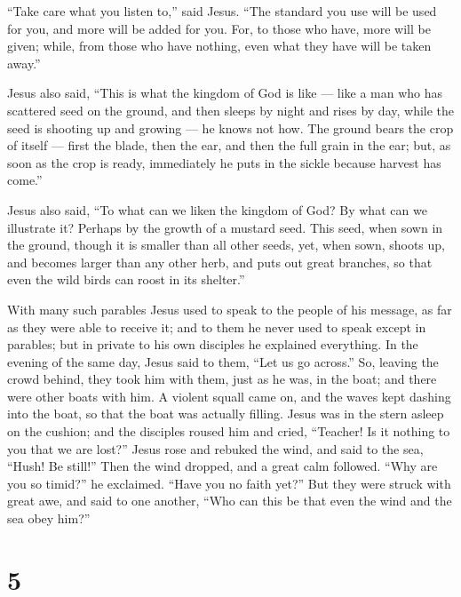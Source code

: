  ``Take care what you listen to,'' said Jesus. ``The
standard you use will be used for you, and more will be added for you.
 For, to those who have, more will be given; while, from
those who have nothing, even what they have will be taken away.''

 Jesus also said, ``This is what the kingdom of God is like
--- like a man who has scattered seed on the ground,  and
then sleeps by night and rises by day, while the seed is shooting up and
growing --- he knows not how.  The ground bears the crop of
itself --- first the blade, then the ear, and then the full grain in the
ear;  but, as soon as the crop is ready, immediately he
puts in the sickle because harvest has come.''

 Jesus also said, ``To what can we liken the kingdom of
God?  By what can we illustrate it? Perhaps by the growth
of a mustard seed. This seed, when sown in the ground, though it is
smaller than all other seeds,  yet, when sown, shoots up,
and becomes larger than any other herb, and puts out great branches, so
that even the wild birds can roost in its shelter.''

 With many such parables Jesus used to speak to the people
of his message, as far as they were able to receive it; 
and to them he never used to speak except in parables; but in private to
his own disciples he explained everything.  In the evening
of the same day, Jesus said to them, ``Let us go across.'' 
So, leaving the crowd behind, they took him with them, just as he was,
in the boat; and there were other boats with him.  A
violent squall came on, and the waves kept dashing into the boat, so
that the boat was actually filling.  Jesus was in the stern
asleep on the cushion; and the disciples roused him and cried,
``Teacher! Is it nothing to you that we are lost?''  Jesus
rose and rebuked the wind, and said to the sea, ``Hush! Be still!'' Then
the wind dropped, and a great calm followed.  ``Why are you
so timid?'' he exclaimed. ``Have you no faith yet?''  But
they were struck with great awe, and said to one another, ``Who can this
be that even the wind and the sea obey him?''

\hypertarget{section-4}{%
\section{5}\label{section-4}}

